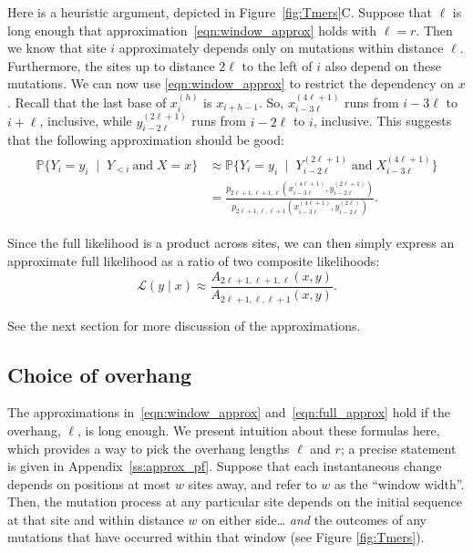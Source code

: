 \documentclass{article}
\renewcommand{\P}{\mathbb{P}}
\newcommand{\calS}{\mathcal{S}}  %
\newcommand{\given}{\;\mid\;}
\newcommand{\like}{\mathcal L}
\theoremstyle{plain}
\theoremstyle{definition}
\begin{document}
Here is a heuristic argument, depicted in Figure~\ref{fig:Tmers}C.
Suppose that $\ell$ is long enough that approximation~\eqref{eqn:window_approx} holds
with $\ell = r$.
Then we know that site $i$ approximately depends only on mutations within distance $\ell$.
Furthermore, the sites up to distance $2 \ell$ to the left of $i$
also depend on these mutations.
We can now use \eqref{eqn:window_approx} to restrict the dependency on $x$.
Recall that the last base of $x_i^{(h)}$ is $x_{i+h-1}$.
So, $x_{i-3\ell}^{(4\ell+1)}$ runs from $i-3\ell$ to $i + \ell$, inclusive, while $y_{i-2\ell}^{(2\ell+1)}$ runs from $i-2\ell$ to $i$, inclusive.
This suggests that the following approximation should be good:
\begin{align} \label{eqn:full_approx}
    \begin{split}
    \P\{ Y_i = y_i \given Y_{<i} \ \text{and}\; X=x \}
    &\approx
        \P\{ Y_i = y_i \given Y_{i-2\ell}^{(2\ell+1)} \;\text{and}\; X_{i-3\ell}^{(4\ell+1)} \}  \\
    &=
        \frac{
            p_{2\ell+1,\ell+1,\ell}(x_{i-3\ell}^{(4\ell+1)}, y_{i-2\ell}^{(2\ell+1)})
        }{
            p_{2\ell+1,\ell,\ell+1}(x_{i-3\ell}^{(4\ell+1)}, y_{i-2\ell}^{(2\ell)})
        }.
    \end{split}
\end{align}

Since the full likelihood is a product across sites,
we can then simply express an approximate full likelihood as
a ratio of two composite likelihoods:
\[
    \like(y \mid x) \approx \frac{ A_{2\ell+1, \ell+1, \ell}(x,y) }{ A_{2\ell+1, \ell, \ell+1}(x,y) }.
\]

See the next section for more discussion of the approximations.

\subsection{Choice of overhang}

The approximations in~\eqref{eqn:window_approx} and~\eqref{eqn:full_approx} hold
if the overhang, $\ell$, is long enough.
We present intuition about these formulas here, which provides a way to pick the overhang lengths $\ell$ and $r$;
a precise statement is given in Appendix~\ref{ss:approx_pf}.
Suppose that each instantaneous change depends on positions at most $w$ sites away,
and refer to $w$ as the ``window width''.
Then, the mutation process at any particular site
depends on the initial sequence at that site and within distance $w$ on either side\ldots
\emph{and} the outcomes of any mutations that have occurred within that window
(see Figure \ref{fig:Tmers}).
\end{document}
